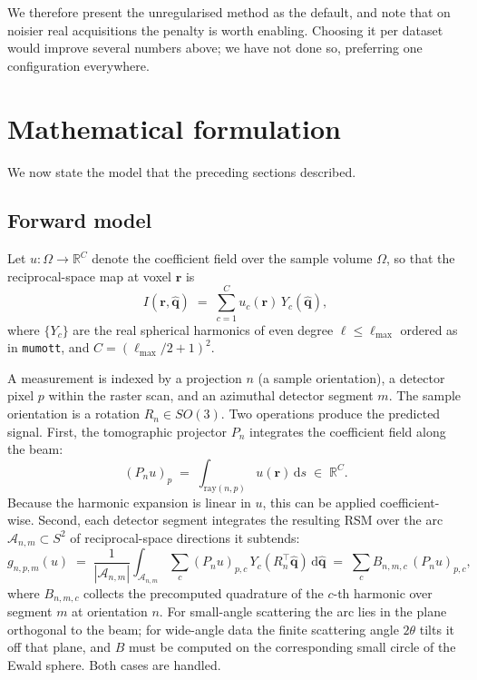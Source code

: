 \documentclass[11pt,a4paper]{article}
\newcommand{\ellmax}{\ell_{\mathrm{max}}}
\newcommand{\qvec}{\hat{\boldsymbol{q}}}
\newcommand{\rvec}{\boldsymbol{r}}
\begin{document}
We therefore present the unregularised method as the default, and note that on noisier real
acquisitions the penalty is worth enabling. Choosing it per dataset would improve several
numbers above; we have not done so, preferring one configuration everywhere.

\section{Mathematical formulation}
\label{sec:formulation}

We now state the model that the preceding sections described.

\subsection{Forward model}

Let $u : \Omega \to \mathbb{R}^{C}$ denote the coefficient field over the sample volume
$\Omega$, so that the reciprocal-space map at voxel $\rvec$ is
\begin{equation}
I(\rvec, \qvec) \;=\; \sum_{c=1}^{C} u_c(\rvec)\, Y_c(\qvec),
\end{equation}
where $\{Y_c\}$ are the real spherical harmonics of even degree $\ell \le \ellmax$ ordered
as in \texttt{mumott}, and $C = (\ellmax/2+1)^2$.

A measurement is indexed by a projection $n$ (a sample orientation), a detector pixel
$p$ within the raster scan, and an azimuthal detector segment $m$. The sample orientation
is a rotation $R_n \in SO(3)$. Two operations produce the predicted signal. First, the
tomographic projector $P_n$ integrates the coefficient field along the beam:
\begin{equation}
(P_n u)_p \;=\; \int_{\text{ray}(n,p)} u(\rvec)\, \mathrm{d}s \;\in\; \mathbb{R}^{C}.
\end{equation}
Because the harmonic expansion is linear in $u$, this can be applied coefficient-wise.
Second, each detector segment integrates the resulting RSM over the arc
$\mathcal{A}_{n,m} \subset S^2$ of reciprocal-space directions it subtends:
\begin{equation}
g_{n,p,m}(u) \;=\; \frac{1}{|\mathcal{A}_{n,m}|}
\int_{\mathcal{A}_{n,m}} \sum_c (P_n u)_{p,c}\, Y_c(R_n^{\!\top} \qvec) \,\mathrm{d}\qvec
\;=\; \sum_c B_{n,m,c} \, (P_n u)_{p,c},
\end{equation}
where $B_{n,m,c}$ collects the precomputed quadrature of the $c$-th harmonic over segment
$m$ at orientation $n$. For small-angle scattering the arc lies in the plane orthogonal to
the beam; for wide-angle data the finite scattering angle $2\theta$ tilts it off that
plane, and $B$ must be computed on the corresponding small circle of the Ewald sphere. Both
cases are handled.
\end{document}
